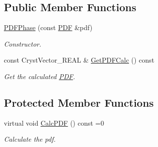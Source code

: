 \subsection*{Public Member Functions}
\begin{DoxyCompactItemize}
\item 
\mbox{\label{class_obj_cryst_1_1_p_d_f_phase_ab6f8534a6578b281cf5bb5334e838db1}} 
\mbox{\hyperlink{class_obj_cryst_1_1_p_d_f_phase_ab6f8534a6578b281cf5bb5334e838db1}{P\+D\+F\+Phase}} (const \mbox{\hyperlink{class_obj_cryst_1_1_p_d_f}{P\+DF}} \&pdf)
\begin{DoxyCompactList}\small\item\em Constructor. \end{DoxyCompactList}\item 
\mbox{\label{class_obj_cryst_1_1_p_d_f_phase_a31516202a119829b9cbe40ba1edb7e1b}} 
const Cryst\+Vector\+\_\+\+R\+E\+AL \& \mbox{\hyperlink{class_obj_cryst_1_1_p_d_f_phase_a31516202a119829b9cbe40ba1edb7e1b}{Get\+P\+D\+F\+Calc}} () const
\begin{DoxyCompactList}\small\item\em Get the calculated \mbox{\hyperlink{class_obj_cryst_1_1_p_d_f}{P\+DF}}. \end{DoxyCompactList}\end{DoxyCompactItemize}
\subsection*{Protected Member Functions}
\begin{DoxyCompactItemize}
\item 
\mbox{\label{class_obj_cryst_1_1_p_d_f_phase_a072386e6d1b75fa364e6bb9551685567}} 
virtual void \mbox{\hyperlink{class_obj_cryst_1_1_p_d_f_phase_a072386e6d1b75fa364e6bb9551685567}{Calc\+P\+DF}} () const =0
\begin{DoxyCompactList}\small\item\em Calculate the pdf. \end{DoxyCompactList}\end{DoxyCompactItemize}
